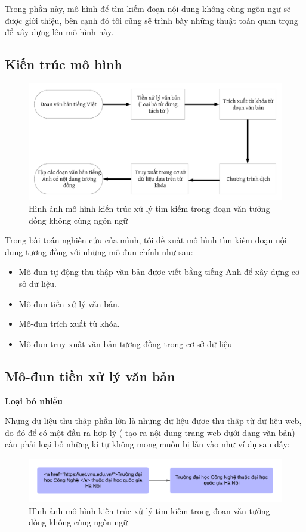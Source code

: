 \documentclass[12pt]{report}
\begin{document}
Trong phần này, mô hình để tìm kiếm đoạn nội dung không cùng ngôn ngữ sẽ được giới thiệu, bên cạnh đó tôi cũng sẽ trình bày những thuật toán quan trọng để xây dựng lên mô hình này.

\subsection{Kiến trúc mô hình}

\begin{figure}[h]
	\centering
	\includegraphics[scale=0.25]{architecture}
	\caption{Hình ảnh mô hình kiến trúc xử lý tìm kiếm trong đoạn văn tưởng đồng không cùng ngôn ngữ}
\end{figure}
Trong bài toán nghiên cứu của mình, tôi đề xuất mô hình tìm kiếm đoạn nội dung tương đồng với những mô-đun chính như sau:
\begin{itemize}
	\item Mô-đun tự động thu thập văn bản được viết bằng tiếng Anh để xây dựng cơ sở dữ liệu.
	\item Mô-đun tiền xử lý văn bản.
	\item Mô-đun trích xuất từ khóa.
	\item Mô-đun truy xuất văn bản tương đồng trong cơ sở dữ liệu
\end{itemize}

\subsection{Mô-đun tiền xử lý văn bản }
\hspace{10mm}\textbf{Loại bỏ nhiễu}

Những dữ liệu thu thập phần lớn là những dữ liệu được thu thập từ dữ liệu web, do đó để có một đầu ra hợp lý ( tạo ra nội dung trang web dưới dạng văn bản) cần phải loại bỏ những kí tự không mong muốn bị lẫn vào như ví dụ sau đây:

\begin{figure}[h]
	\centering
	\includegraphics[scale=0.9]{remove_noise}
	\caption{Hình ảnh mô hình kiến trúc xử lý tìm kiếm trong đoạn văn tưởng đồng không cùng ngôn ngữ}
\end{figure}
\end{document}
